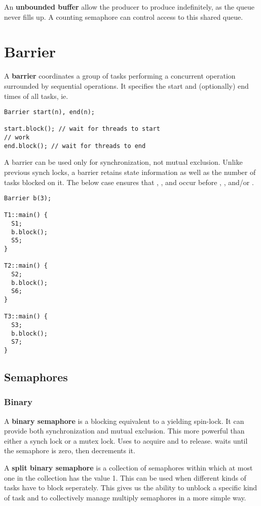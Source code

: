 \documentclass[12pt]{article}
\begin{document}
An {\bf unbounded buffer} allow the producer to produce indefinitely, as the queue never fills up. A counting semaphore can control access to this shared queue.

\section{Barrier}
A {\bf barrier} coordinates a group of tasks performing a concurrent operation surrounded by sequential operations. It specifies the start and (optionally) end times of all tasks, ie.
\begin{verbatim}
Barrier start(n), end(n);

start.block(); // wait for threads to start
// work
end.block(); // wait for threads to end
\end{verbatim}

A barrier can be used only for synchronization, not mutual exclusion. Unlike previous synch locks, a barrier retains state information as well as the number of tasks blocked on it. The below case ensures that , , and  occur before , , and/or .
\begin{verbatim}
Barrier b(3);

T1::main() {
  S1;
  b.block();
  S5;
}

T2::main() {
  S2;
  b.block();
  S6;
}

T3::main() {
  S3;
  b.block();
  S7;
}
\end{verbatim}

\subsection{Semaphores}
\subsubsection{Binary}
A {\bf binary semaphore} is a blocking equivalent to a yielding spin-lock. It can provide both synchronization and mutual exclusion. This more powerful than either a synch lock or a mutex lock. Uses  to acquire and  to release.  waits until the semaphore is zero, then decrements it.

A {\bf split binary semaphore} is a collection of semaphores within which at most one in the collection has the value 1. This can be used when different kinds of tasks have to block seperately. This gives us the ability to unblock a specific kind of task and to collectively manage multiply semaphores in a more simple way.
\end{document}
